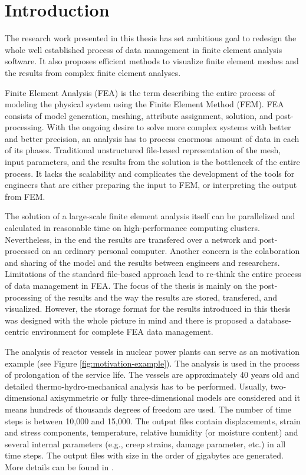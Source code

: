 \chapter{Introduction}
\label{chapter:introduction}

The research work presented in this thesis has set ambitious goal to redesign the whole well established process of data management in finite element analysis software. It also proposes efficient methods to visualize finite element meshes and the results from complex finite element analyses.

Finite Element Analysis (FEA) is the term describing the entire process of modeling the physical system using the Finite Element Method (FEM). FEA consists of model generation, meshing, attribute assignment, solution, and post-processing. With the ongoing desire to solve more complex systems with better and better precision, an analysis has to process enormous amount of data in each of its phases. Traditional unstructured file-based representation of the mesh, input parameters, and the results from the solution is the bottleneck of the entire process. It lacks the scalability and complicates the development of the tools for engineers that are either preparing the input to FEM, or interpreting the output from FEM.

The solution of a large-scale finite element analysis itself can be parallelized and calculated in reasonable time on high-performance computing clusters. Nevertheless, in the end the results are transfered over a network and post-processed on an ordinary personal computer. Another concern is the colaboration and sharing of the model and the results between engineers and researchers. Limitations of the standard file-based approach lead to re-think the entire process of data management in FEA. The focus of the thesis is mainly on the post-processing of the results and the way the results are stored, transfered, and visualized. However, the storage format for the results introduced in this thesis was designed with the whole picture in mind and there is proposed a database-centric environment for complete FEA data management.

The analysis of reactor vessels in nuclear power plants can serve as an motivation example (see Figure \ref{fig:motivation-example}). The analysis is used in the process of prolongation of the service life. The vessels are approximately 40 years old and detailed thermo-hydro-mechanical analysis has to be performed. Usually, two-dimensional axisymmetric or fully three-dimensional models are considered and it means hundreds of thousands degrees of freedom are used. The number of time steps is between 10,000 and 15,000. The output files contain displacements, strain and stress components, temperature, relative humidity (or moisture content) and several internal parameters (e.g., creep strains, damage parameter, etc.) in all time steps. The output files with size in the order of gigabytes are generated. More details can be found in \cite{Kruis2010,Krejci2015}.

